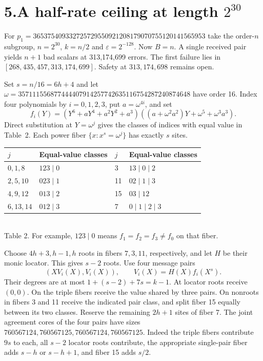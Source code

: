 \documentclass[11pt,letterpaper]{article}
\begin{document}
\newpage
\section*{5.\quad A half-rate ceiling at length \texorpdfstring{$2^{30}$}{2 to the 30}}
For $p_1=365375409332725729550921208179070755120141565953$ take the order-$n$ subgroup, $n=2^{30}$, $k=n/2$ and $\varepsilon=2^{-128}$. Now $B=n$. A single received pair yields $n+1$ bad scalars at 313,174,699 errors. The first failure lies in $[268{,}435{,}457,313{,}174{,}699]$. Safety at $313{,}174{,}698$ remains open.

Set $s=n/16=6h+4$ and let $\omega=357111556877444407914257742635116754287240874648$ have order 16. Index four polynomials by $i=0,1,2,3$, put $a=\omega^{4i}$, and set
\[
 f_i(Y)=(Y^6+aY^4+a^2Y^2+a^3)
        ((a+\omega^2a^2)Y+\omega^5+\omega^3a^3).
\]
Direct substitution at $Y=\omega^j$ gives the classes of indices with equal value in Table~2. Each power fiber $\{x:x^s=\omega^j\}$ has exactly $s$ sites.
\begin{center}\small
\begin{tabular}{@{}ll@{\qquad}ll@{}}\toprule
$j$ & Equal-value classes & $j$ & Equal-value classes\\\midrule
$0,1,8$  & $123\mid0$ &3&$13\mid0\mid2$\\
$2,5,10$ & $023\mid1$ &11&$02\mid1\mid3$\\
$4,9,12$ & $013\mid2$ &15&$03\mid12$\\
$6,13,14$& $012\mid3$ &7&$0\mid1\mid2\mid3$\\\bottomrule
\end{tabular}\\[4pt]
Table 2. For example, $123\mid0$ means $f_1=f_2=f_3\ne f_0$ on that fiber.
\end{center}
Choose $4h+3,h-1,h$ roots in fibers $7,3,11$, respectively, and let $H$ be their monic locator. This gives $s-2$ roots. Use four message pairs
\[
 (X V_i(X),V_i(X)),\qquad V_i(X)=H(X)f_i(X^s).
\]
Their degrees are at most $1+(s-2)+7s=k-1$. At locator roots receive $(0,0)$. On the triple fibers receive the value shared by three pairs. On nonroots in fibers 3 and 11 receive the indicated pair class, and split fiber 15 equally between its two classes. Reserve the remaining $2h+1$ sites of fiber 7. The joint agreement cores of the four pairs have sizes $760567124,760567125,760567124,760567125$. Indeed the triple fibers contribute $9s$ to each, all $s-2$ locator roots contribute, the appropriate single-pair fiber adds $s-h$ or $s-h+1$, and fiber 15 adds $s/2$.
\end{document}
